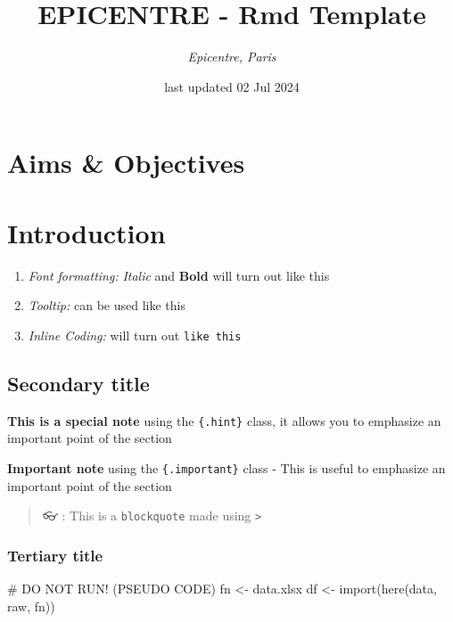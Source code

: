 \documentclass[
  a4paper]{scrartcl}
\title{EPICENTRE - Rmd Template}
\author{\emph{Epicentre, Paris}}
\date{last updated 02 Jul 2024}
\newenvironment{Shaded}{}{}
\newcommand{\CommentTok}[1]{\textcolor[rgb]{0.00,0.50,0.00}{#1}}
\newcommand{\FunctionTok}[1]{#1}
\newcommand{\NormalTok}[1]{#1}
\newcommand{\OtherTok}[1]{\textcolor[rgb]{1.00,0.25,0.00}{#1}}
\newcommand{\StringTok}[1]{\textcolor[rgb]{0.00,0.50,0.50}{#1}}
\newenvironment{hint}{
\color{primary}
\begin{hintbox}}
{\end{hintbox}}
\newenvironment{important}{
\color{primary}
\begin{impbox}}
{\end{impbox}}
\begin{document}
\maketitle

{
\setcounter{tocdepth}{2}
\tableofcontents
}
\section{Aims \& Objectives}\label{aims-objectives}

\section{Introduction}\label{introduction}

\begin{enumerate}
\def\labelenumi{\arabic{enumi}.}
\item
  \emph{Font formatting:} \emph{Italic} and \textbf{Bold} will turn out
  like this
\item
  \emph{Tooltip:} can be used {like this}
\item
  \emph{Inline Coding:} will turn out \texttt{like\ this}
\end{enumerate}

\subsection{Secondary title}\label{secondary-title}

\begin{hint}
\textbf{This is a special note} using the \texttt{\{.hint\}} class, it
allows you to emphasize an important point of the section

\end{hint}

\begin{important}
\textbf{Important note} using the \texttt{\{.important\}} class - This
is useful to emphasize an important point of the section

\end{important}

\begin{quote}
👓 : This is a \texttt{blockquote} made using \texttt{\textgreater{}}
\end{quote}

\subsubsection{Tertiary title}\label{tertiary-title}

\begin{Shaded}
\begin{Highlighting}[]
\CommentTok{\# DO NOT RUN! (PSEUDO CODE)}
\NormalTok{fn }\OtherTok{\textless{}{-}} \StringTok{\textquotesingle{}data.xlsx\textquotesingle{}}
\NormalTok{df }\OtherTok{\textless{}{-}} \FunctionTok{import}\NormalTok{(}\FunctionTok{here}\NormalTok{(}\StringTok{\textquotesingle{}data\textquotesingle{}}\NormalTok{, }\StringTok{\textquotesingle{}raw\textquotesingle{}}\NormalTok{, fn))}
\end{Highlighting}
\end{Shaded}
\end{document}
